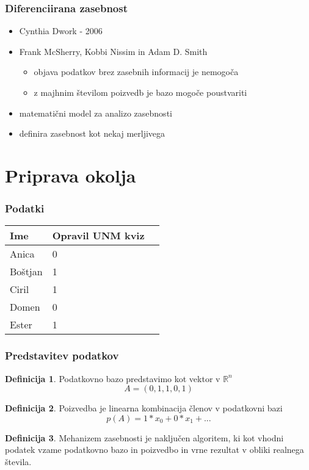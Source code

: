 \documentclass{beamer}
\newcommand{\R}{\mathbb{R}}
\theoremstyle{definition}
\newtheorem{dingli}{Definicija}
\begin{document}

\begin{frame}
\frametitle{Diferenciirana zasebnost}
\begin{itemize}
	\item Cynthia Dwork - 2006
	\item Frank McSherry, Kobbi Nissim in Adam D. Smith
\begin{itemize}
	\item objava podatkov brez zasebnih informacij je nemogoča
	\item z majhnim številom poizvedb je bazo mogoče poustvariti
\end{itemize}
	\item matematični model za analizo zasebnosti
	\item definira zasebnost kot nekaj merljivega
\end{itemize}
\end{frame}


\section{Priprava okolja}

\begin{frame}
\frametitle{Podatki}
\begin{table}
\begin{tabular}{l l l}
\toprule
\textbf{Ime} & \textbf{Opravil UNM kviz} \\
\midrule
Anica & 0 \\
Boštjan & 1 \\
Ciril & 1 \\
Domen & 0 \\
Ester & 1 \\
\bottomrule
\end{tabular}
\end{table}
\end{frame}


\begin{frame}
	\frametitle{Predstavitev podatkov}
	\begin{dingli}{\alert{Podatkovno bazo}}
		predstavimo  kot vektor v $\R^n$
		$$ A = (0, 1, 1, 0, 1)$$
	\end{dingli}
	\begin{dingli}{\alert{Poizvedba}}
	je linearna kombinacija členov v podatkovni bazi
	$$ p(A) = 1 * x_0 + 0 * x_1 + ...$$
    \end{dingli}
	\begin{dingli}{\alert{Mehanizem zasebnosti}}
	je naključen algoritem, ki kot vhodni podatek vzame podatkovno bazo in poizvedbo in vrne rezultat v obliki realnega števila.
\end{dingli}
\end{frame}
\end{document}
